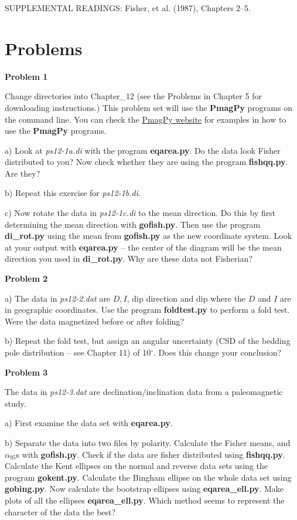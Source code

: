 \vskip 12pt
\noindent SUPPLEMENTAL READINGS: Fisher,  et al. (1987), Chapters 2--5.  \nocite{fisher87}

\vskip 12pt

\section{Problems}

{\parindent 0pt  \parskip 8pt

{\bf Problem 1 }

 Change directories into Chapter\_12 (see the Problems in Chapter 5 for downloading instructions.)    This problem set will use the {\bf PmagPy} programs on the command line.  You can check the \href{http://earthref.org/PmagPy/cookbook/}{PmagPy website} for examples in how to use the {\bf PmagPy} programs. 
 
 a)
Look at {\it ps12-1a.di} with the program {\bf eqarea.py}.  Do the data look Fisher distributed to you?   
Now check whether they are using the program {\bf fishqq.py}.  Are they?   

b) Repeat this exercise for {\it ps12-1b.di}.  

c)  Now rotate the data in {\it ps12-1c.di}  to the mean direction.    Do this by first determining the mean  direction with {\bf gofish.py}.     Then use the program {\bf di\_rot.py} using the mean from {\bf gofish.py} as the new coordinate system.  Look at your output with {\bf eqarea.py} -- the center of the diagram will be the mean direction you used in {\bf di\_rot.py}.   Why are these data not Fisherian?  

{\bf Problem 2} 

a) The data in {\it ps12-2.dat} are $D, I$, dip direction and dip where the $D$ and $I$ are in geographic coordinates.   Use the program {\bf foldtest.py} to perform a fold test.  Were the data magnetized before or after folding?   

b) Repeat the fold test, but assign an angular uncertainty (CSD of the bedding pole distribution -- see Chapter 11) of 10$^{\circ}$.  Does this change your conclusion?  


{\bf Problem 3}

The data in {\it ps12-3.dat} are declination/inclination data from a paleomagnetic study. 

a)  First examine the data set  
with {\bf eqarea.py}.  

b) Separate the data into two files by polarity.  Calculate the Fisher means, and $\alpha_{95}$s with {\bf gofish.py}.  Check if the data are fisher distributed using {\bf fishqq.py}.   Calculate the Kent ellipses on the normal and reverse data sets using the program {\bf gokent.py}.  Calculate the Bingham ellipse on the whole data set using {\bf gobing.py}.  Now calculate the bootstrap ellipses using {\bf eqarea\_ell.py}.    Make plots of all the ellipses {\bf eqarea\_ell.py}.   Which method seems to represent the character of the data the best?

}
